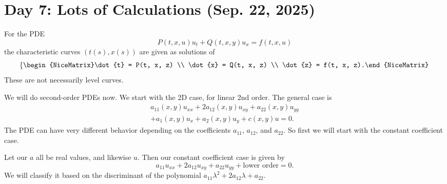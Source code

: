 \section{Day 7: Lots of Calculations (Sep. 22, 2025)}
\begin{remark}
	For the PDE 
	\[ P(t, x, u) u_{t} + Q(t, x, y) u_{x} = f(t, x, u) \]
	the characteristic curves \( (t(s), x(s)) \) are given as solutions of
	\[ \left\{\begin{NiceMatrix}\dot{t} = P(t, x, z) \\ \dot{x} = Q(t, x, z) \\ \dot{z} = f(t, x, z).\end{NiceMatrix}\right.  \]
	These are not necessarily level curves.
\end{remark}

We will do second-order PDEs now. We start with the 2D case, for linear 2nd order. The general case is
\begin{align*}
	a_{11}(x, y) u_{x x} + 2 a_{1 2}(x, y) u_{xy} + a_{22}(x, y) u_{y y} \\
	\tag{lower order terms} + a_{1}(x, y) u_{x} + a_{2}(x, y) u_{y} + c(x, y) u = 0.
\end{align*}
The PDE can have very different behavior depending on the coefficients \( a_{11} \), \( a_{12} \), and \( a_{22} \). So first we will start with the constant coefficient case.

Let our \( a \) all be real values, and likewise \( u \). Then our constant coefficient case is given by
\[ \tag{\( * \)}a_{11} u_{x x} + 2a_{12} u_{x y} + a_{22}u_{yy} + \text{lower order} = 0. \]
	We will classify it based on the discriminant of the polynomial \( a_{11} \lambda^{2} + 2a_{12} \lambda + a_{22} \).

